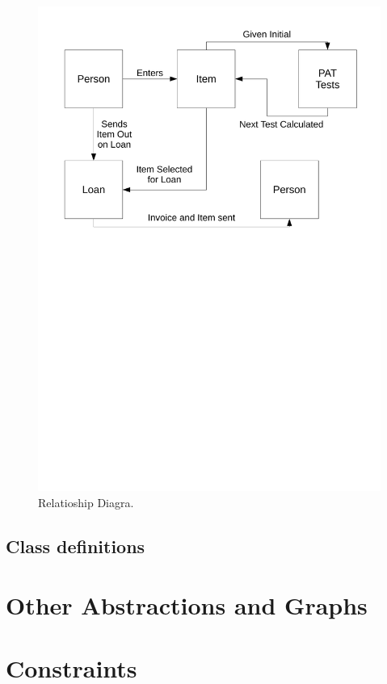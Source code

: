 \documentclass[a4paper,12pt]{report}
\begin{document}
\begin{figure}[H]
    \caption{Relatioship Diagra.} \label{fig:relationship_diadram}
    \includegraphics[width=\textwidth]{./Relationship_Diagrams/Relationships_diagrams.pdf}
\end{figure}

\subsection{Class definitions}



\section{Other Abstractions and Graphs}

\section{Constraints}
\end{document}
